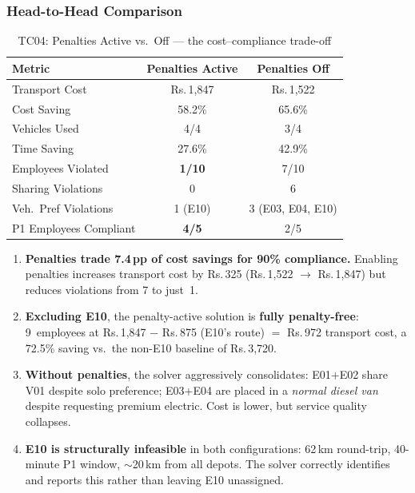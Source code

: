 \documentclass[11pt,a4paper]{article}
\newcommand{\rupee}{Rs.}
\begin{document}
\subsubsection{Head-to-Head Comparison}

\begin{table}[H]
\centering
\caption{TC04: Penalties Active vs.\ Off --- the cost--compliance trade-off}
\label{tab:tc04-comparison}
\small
\begin{tabular}{lcc}
\toprule
\textbf{Metric} & \textbf{Penalties Active} & \textbf{Penalties Off} \\
\midrule
\rowcolor{rowalt}
Transport Cost & \rupee\,1,847 & \rupee\,1,522 \\
Cost Saving & 58.2\% & 65.6\% \\
\rowcolor{rowalt}
Vehicles Used & 4/4 & 3/4 \\
Time Saving & 27.6\% & 42.9\% \\
\rowcolor{rowalt}
Employees Violated & \textbf{1/10} & 7/10 \\
Sharing Violations & 0 & 6 \\
\rowcolor{rowalt}
Veh.\ Pref Violations & 1 (E10) & 3 (E03, E04, E10) \\
P1 Employees Compliant & \textbf{4/5} & 2/5 \\
\bottomrule
\end{tabular}
\end{table}

\begin{insightbox}
\begin{enumerate}[nosep, leftmargin=1.2em]
    \item \textbf{Penalties trade 7.4\,pp of cost savings for 90\% compliance.} Enabling penalties increases transport cost by \rupee\,325 (\rupee\,1,522 $\to$ \rupee\,1,847) but reduces violations from 7 to just~1.
    \item \textbf{Excluding E10}, the penalty-active solution is \textbf{fully penalty-free}: 9~employees at \rupee\,1,847 $-$ \rupee\,875 (E10's route) $=$ \rupee\,972 transport cost, a 72.5\% saving vs.\ the non-E10 baseline of \rupee\,3,720.
    \item \textbf{Without penalties}, the solver aggressively consolidates: E01+E02 share V01 despite solo preference; E03+E04 are placed in a \emph{normal diesel van} despite requesting premium electric. Cost is lower, but service quality collapses.
    \item \textbf{E10 is structurally infeasible} in both configurations: 62\,km round-trip, 40-minute P1 window, $\sim$20\,km from all depots. The solver correctly identifies and reports this rather than leaving E10 unassigned.
\end{enumerate}
\end{insightbox}
\end{document}
